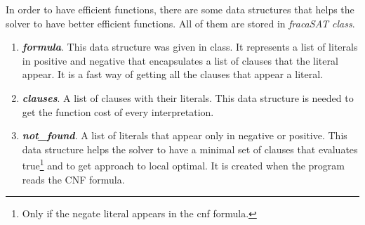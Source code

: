 
In order to have efficient functions, there are some data structures that helps the solver to have better efficient functions. All of them are stored in \textit{fracaSAT class}.
\begin{enumerate}
\item \textbf{\textit{formula}}. This data structure was given in class. It represents a list of literals in positive and negative that encapsulates a list of clauses that the literal appear. It is a fast way of getting all the clauses that appear a literal.
\item \textbf{\textit{clauses}}. A list of clauses with their literals. This data structure is needed to get the function cost of every interpretation.
\item \textbf{\textit{not\_found}}. A list of literals that appear only in negative or positive. This data structure helps the solver to have a minimal set of clauses that evaluates true\footnote{Only if the negate literal appears in the cnf formula.} and to get approach to local optimal. It is created when the program reads the CNF formula.
\end{enumerate}
